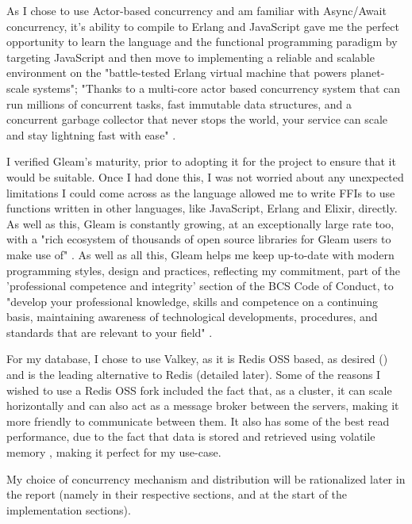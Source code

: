 \documentclass[]{final}
\begin{document}
As I chose to use Actor-based concurrency and am familiar with
Async/Await concurrency, it's ability to compile to Erlang and
JavaScript gave me the perfect opportunity to learn the language and
the functional programming paradigm by targeting JavaScript and then
move to implementing a reliable and scalable environment on the
"battle-tested Erlang virtual machine that powers planet-scale systems";
"Thanks to a multi-core actor based concurrency system that can run millions
of concurrent tasks, fast immutable data structures, and a concurrent garbage
collector that never stops the world, your service can scale and stay lightning
fast with ease" \cite{noauthor_gleam_nodate}.

I verified Gleam's maturity, prior to adopting it for the project to ensure
that it would be suitable. Once I had done this, I was not worried about
any unexpected limitations I could come across as the language allowed
me to write FFIs to use functions written in other languages, like JavaScript,
Erlang and Elixir, directly. As well as this, Gleam is constantly growing\cite{noauthor_news_nodate},
at an exceptionally large rate too\cite{shashtari_why_2024}, with a "rich ecosystem of thousands of
open source libraries for Gleam users to make use of" \cite{noauthor_gleam_nodate}.
As well as all this, Gleam helps me keep up-to-date with modern
programming styles, design and practices, reflecting my commitment,
part of the 'professional competence and integrity' section of the
BCS Code of Conduct, to
"develop your professional knowledge, skills and competence on a continuing
basis, maintaining awareness of technological developments, procedures, and
standards that are relevant to your field" \cite{noauthor_bcs_nodate}.

For my database, I chose to use Valkey, as it is Redis OSS based, as
desired {\hypersetup{linkcolor=teal}(\pageref{REDISOSS})} and is
the leading alternative to Redis (detailed later).
Some of the reasons I wished to use a Redis OSS fork included
the fact that,
as a cluster, it can scale horizontally and can also act as a message
broker between the servers, making it more friendly to communicate
between them. It also has some of the best read
performance, due to the fact that data is stored and retrieved
using volatile memory \cite{department_of_information_systems_university_of_nizwa_sultanate_of_oman_study_2022},
making it perfect for my use-case.

My choice of concurrency mechanism and distribution will be
rationalized later in the report (namely in their respective sections,
and at the start of the implementation sections).
\end{document}
